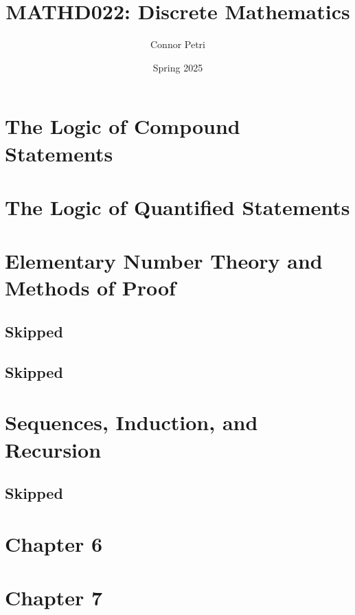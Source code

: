 \documentclass[12pt, letterpaper]{article}
\title{MATHD022: Discrete Mathematics}
\author{Connor Petri}
\date{Spring 2025}
\begin{document}
\maketitle
\pagebreak
\tableofcontents
\pagebreak





\section{The Logic of Compound Statements}




\section{The Logic of Quantified Statements}





\section{Elementary Number Theory and Methods of Proof}

\pagebreak
\subsection{Skipped}
\hrulefill



\pagebreak
\subsection{Skipped}


\section{Sequences, Induction, and Recursion}




\subsection{Skipped}
\pagebreak



\section{Chapter 6}

\pagebreak

\section{Chapter 7}
\end{document}
